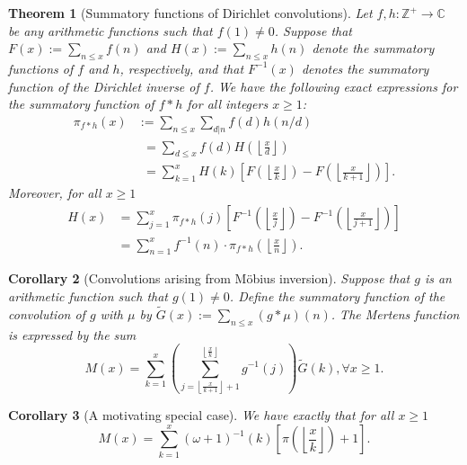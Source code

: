 \documentclass[11pt,reqno,a4letter]{article}
\numberwithin{figure}{section}
\numberwithin{table}{section}
\newcommand{\floor}[1]{\left\lfloor #1 \right\rfloor}
\newcommand{\Floor}[2]{\ensuremath{\left\lfloor \frac{#1}{#2} \right\rfloor}}
\theoremstyle{plain}
\newtheorem{theorem}{Theorem}
\newtheorem{cor}[theorem]{Corollary}
\numberwithin{theorem}{section}
\theoremstyle{definition}
\begin{document}
\begin{theorem}[Summatory functions of Dirichlet convolutions] 
\label{theorem_SummatoryFuncsOfDirCvls} 
Let $f,h: \mathbb{Z}^{+} \rightarrow \mathbb{C}$ be any arithmetic functions such that $f(1) \neq 0$. 
Suppose that $F(x) := \sum_{n \leq x} f(n)$ and $H(x) := \sum_{n \leq x} h(n)$ denote the summatory 
functions of $f$ and $h$, respectively, and that $F^{-1}(x)$ denotes the summatory function of the 
Dirichlet inverse of $f$. We have the following exact expressions for the 
summatory function of $f \ast h$ for all integers $x \geq 1$: 
\begin{align*} 
\pi_{f \ast h}(x) & := \sum_{n \leq x} \sum_{d|n} f(d) h(n/d) \\ 
     & \phantom{:}= \sum_{d \leq x} f(d) H\left(\Floor{x}{d}\right) \\ 
     & \phantom{:}= \sum_{k=1}^{x} H(k) \left[F\left(\Floor{x}{k}\right) - 
     F\left(\Floor{x}{k+1}\right)\right]. 
\end{align*} 
Moreover, for all $x \geq 1$ 
\begin{align*} 
H(x) & = \sum_{j=1}^{x} \pi_{f \ast h}(j) \left[F^{-1}\left(\Floor{x}{j}\right) - 
     F^{-1}\left(\Floor{x}{j+1}\right)\right] \\ 
     & = \sum_{n=1}^{x} f^{-1}(n) \cdot \pi_{f \ast h}\left(\Floor{x}{n}\right). 
\end{align*} 
\end{theorem} 

\begin{cor}[Convolutions arising from M\"obius inversion] 
\label{cor_CvlGAstMu} 
Suppose that $g$ is an arithmetic function such that 
$g(1) \neq 0$. Define the summatory function of 
the convolution of $g$ with $\mu$ by $\widetilde{G}(x) := \sum_{n \leq x} (g \ast \mu)(n)$. 
The Mertens function is expressed by the sum 
\[
M(x) = \sum_{k=1}^{x} \left(\sum_{j=\floor{\frac{x}{k+1}}+1}^{\floor{\frac{x}{k}}} g^{-1}(j)\right) 
     \widetilde{G}(k), \forall x \geq 1. 
\]
\end{cor} 

\begin{cor}[A motivating special case] 
\label{cor_Mx_gInvnPixk_formula} 
We have exactly that for all $x \geq 1$ 
\begin{equation} 
\label{eqn_Mx_gInvnPixk_formula} 
M(x) = \sum_{k=1}^{x} (\omega+1)^{-1}(k) \left[\pi\left(\Floor{x}{k}\right) + 1\right]. 
\end{equation} 
\end{cor} 
\end{document}
